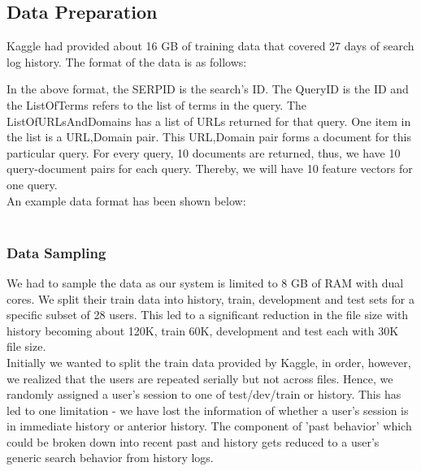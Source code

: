 \documentclass[11pt,letterpaper]{article}
\begin{document}
\subsection{Data Preparation}
Kaggle had provided about 16 GB of training data that covered 27 days of search log history. The format of the data is as follows:\\

In the above format, the SERPID is the search's ID. The QueryID is the ID and the ListOfTerms refers to the list of terms in the query. The ListOfURLsAndDomains has a list of URLs returned for that query. One item in the list is a URL,Domain pair. This URL,Domain pair forms a document for this particular query. For every query, 10 documents are returned, thus, we have 10 query-document pairs for each query. Thereby, we will have 10 feature vectors for one query.
\\An example data format has been shown below:\\

\\
\subsubsection{Data Sampling}
We had to sample the data as our system is limited to 8 GB of RAM with dual cores. We split their train data into history, train, development and test sets for a specific subset of 28 users. This led to a significant reduction in the file size with history becoming about 120K, train 60K, development and test each with 30K file size.\\ Initially we wanted to split the train data provided by Kaggle, in order, however, we realized that the users are repeated serially but not across files. Hence, we randomly assigned a user's session to one of test/dev/train or history. This has led to one limitation - we have lost the information of whether a user's session is in immediate history or anterior history. The component of 'past behavior' which could be broken down into recent past and history gets reduced to a user's generic search behavior from history logs.\\
\end{document}
